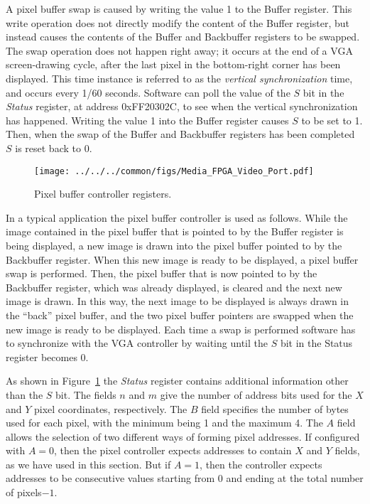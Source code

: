 A pixel buffer swap is caused by writing the value 1 to the Buffer register. This write
operation does not directly modify the content of the Buffer register, but instead causes
the contents of the Buffer and Backbuffer registers to be swapped. The swap operation does
not happen right away; it occurs at the end of a VGA screen-drawing cycle, after the last 
pixel in the bottom-right corner has been displayed. This time instance is referred to as
the {\it vertical synchronization} time, and occurs every 1/60 seconds. Software can poll the
value of the $S$ bit in the {\it Status} register, at address {\sf 0xFF20302C}, to see when 
the vertical synchronization has happened. Writing the value 1 into the Buffer register
causes $S$ to be set to 1. Then, when the swap of the Buffer and Backbuffer registers 
has been completed $S$ is reset back to 0.  

\begin{figure}[h!]
   \begin{center}
       \texttt{[image: ../../../common/figs/Media\_FPGA\_Video\_Port.pdf]}
   \end{center}
   \caption{Pixel buffer controller registers.}
	\label{fig:pixel_ctrl}
\end{figure}

In a typical application the pixel buffer controller is used as follows. While the image
contained in the pixel buffer that is pointed to by the Buffer register is being displayed, 
a new image is drawn into the pixel buffer pointed to by the Backbuffer register. When this new
image is ready to be displayed, a pixel buffer swap is performed. Then, the pixel buffer 
that is now pointed to by the Backbuffer register, which was already displayed, is cleared and 
the next new image is drawn. In this way, the next image to be displayed is always drawn in
the ``back'' pixel buffer, and the two pixel buffer pointers are swapped when the new image 
is ready to be displayed. Each time a swap is performed software has to synchronize with
the VGA controller by waiting until the $S$ bit in the Status register becomes 0.

As shown in Figure~\ref{fig:pixel_ctrl} the {\it Status} register contains additional information
other than the $S$ bit. The fields $n$ and $m$ give the number of address bits used for
the $X$ and $Y$ pixel coordinates, respectively. The $B$ field specifies the number of
bytes used for each pixel, with the minimum being 1 and the maximum 4. The $A$ field allows 
the selection of two different ways of forming pixel addresses. If configured with $A=0$, then 
the pixel controller expects addresses to contain $X$ and $Y$ fields, as we have used in this
section. But if $A=1$, then the controller expects addresses to be consecutive
values starting from 0 and ending at the total number of pixels$ - 1$.


